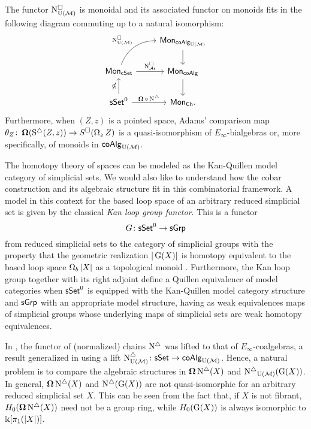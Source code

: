 \begin{theorem} \label{t:1st main thm in the intro}
	The functor $\operatorname{N^{\square}_{{\operatorname{U}(\mathcal{M})}}}$ is monoidal and its associated functor on monoids fits in the following diagram commuting up to a natural isomorphism:
	\begin{equation*}
	\begin{tikzcd}
	& \Mon_{\coAlg_\UM} \arrow[d] \\
	\Mon_{\cSet} \arrow[ru, "\cchainsUM", out=70, in=180] \arrow[r, "\cchainsAS"]
	& \Mon_{\coAlg} \arrow[d] \\
	\sSet^0 \arrow[r, "\cobar \circ \schains"] \arrow[u, "\ccobar"]
	& \Mon_{\Ch}.
	\end{tikzcd}
	\end{equation*}
	Furthermore, when $(Z, z)$ is a pointed space, Adams' comparison map $\theta_Z \colon \operatorname{\mathbf{\Omega}}(\operatorname{S^{\triangle}}(Z, z)) \to S^{\square}(\operatorname{\Omega}_z Z)$ is a quasi-isomorphism of $E_{\infty}$-bialgebras or, more specifically, of monoids in $\mathsf{coAlg}_{\operatorname{U}(\mathcal{M})}$.
\end{theorem} 
The homotopy theory of spaces can be modeled as the Kan-Quillen model category of simplicial sets.
We would also like to understand how the cobar construction and its algebraic structure fit in this combinatorial framework.
A model in this context for the based loop space of an arbitrary reduced simplicial set is given by the classical \textit{Kan loop group functor}.
This is a functor 
\begin{equation*}
G\colon \mathsf{sSet}^0 \to \mathsf{sGrp}
\end{equation*}
from reduced simplicial sets to the category of simplicial groups with the property that the geometric realization $|\operatorname{G}(X)|$ is homotopy equivalent to the based loop space $\operatorname{\Omega}_b|X|$ as a topological monoid \cite{berger1995loops}.
Furthermore, the Kan loop group together with its right adjoint define a Quillen equivalence of model categories when $\mathsf{sSet}^0$ is equipped with the Kan-Quillen model category structure and $\mathsf{sGrp}$ with an appropriate model structure, having as weak equivalences maps of simplicial groups whose underlying maps of simplicial sets are weak homotopy equivalences.

In \cite{mcclure2003multivariable, berger2004combinatorial}, the functor of (normalized) chains $\operatorname{N^{\triangle}}$ was lifted to that of $E_{\infty}$-coalgebras, a result generalized in \cite{medina2020prop1} using a lift $\operatorname{N^{\triangle}_{{\operatorname{U}(\mathcal{M})}}} \colon \mathsf{sSet} \to \mathsf{coAlg}_{{\operatorname{U}(\mathcal{M})}}$.
Hence, a natural problem is to compare the algebraic structures in $\operatorname{\mathbf{\Omega}} \operatorname{N^{\triangle}}(X)$ and $\operatorname{N^{\triangle}}_{{\operatorname{U}(\mathcal{M})}}(\operatorname{G}(X))$.
In general, $\operatorname{\mathbf{\Omega}} \operatorname{N^{\triangle}}(X)$ and $\operatorname{N^{\triangle}}(\operatorname{G}(X))$ are not quasi-isomorphic for an arbitrary reduced simplicial set $X$.
This can be seen from the fact that, if $X$ is not fibrant, $H_0(\operatorname{\mathbf{\Omega}} \operatorname{N^{\triangle}}(X))$ need not be a group ring, while $H_0(\operatorname{G}(X))$ is always isomorphic to $ \Bbbk[\pi_1(|X|)]$.

